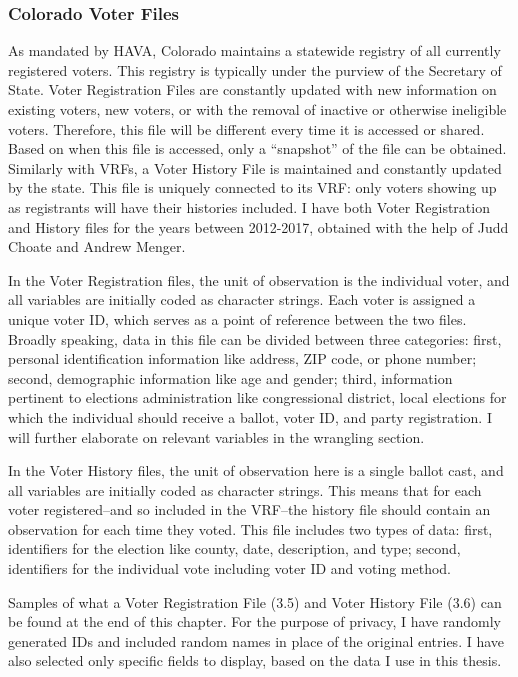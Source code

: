 \documentclass[12pt,twoside]{reedthesis}
\begin{document}
  \subsubsection{Colorado Voter Files}\label{colorado-voter-files}
  
  As mandated by HAVA, Colorado maintains a statewide registry of all
  currently registered voters. This registry is typically under the
  purview of the Secretary of State. Voter Registration Files are
  constantly updated with new information on existing voters, new voters,
  or with the removal of inactive or otherwise ineligible voters.
  Therefore, this file will be different every time it is accessed or
  shared. Based on when this file is accessed, only a ``snapshot'' of the
  file can be obtained. Similarly with VRFs, a Voter History File is
  maintained and constantly updated by the state. This file is uniquely
  connected to its VRF: only voters showing up as registrants will have
  their histories included. I have both Voter Registration and History
  files for the years between 2012-2017, obtained with the help of Judd
  Choate and Andrew Menger.
  
  In the Voter Registration files, the unit of observation is the
  individual voter, and all variables are initially coded as character
  strings. Each voter is assigned a unique voter ID, which serves as a
  point of reference between the two files. Broadly speaking, data in this
  file can be divided between three categories: first, personal
  identification information like address, ZIP code, or phone number;
  second, demographic information like age and gender; third, information
  pertinent to elections administration like congressional district, local
  elections for which the individual should receive a ballot, voter ID,
  and party registration. I will further elaborate on relevant variables
  in the wrangling section.
  
  In the Voter History files, the unit of observation here is a single
  ballot cast, and all variables are initially coded as character strings.
  This means that for each voter registered--and so included in the
  VRF--the history file should contain an observation for each time they
  voted. This file includes two types of data: first, identifiers for the
  election like county, date, description, and type; second, identifiers
  for the individual vote including voter ID and voting method.
  
  Samples of what a Voter Registration File (3.5) and Voter History File
  (3.6) can be found at the end of this chapter. For the purpose of
  privacy, I have randomly generated IDs and included random names in
  place of the original entries. I have also selected only specific fields
  to display, based on the data I use in this thesis.
  
\end{document}
